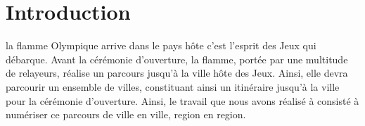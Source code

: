 \section{Introduction}\label{introduction}

\quad\quad la flamme Olympique arrive dans le pays hôte c’est l’esprit des
Jeux qui débarque. Avant la cérémonie d'ouverture, la flamme, portée
par une multitude de relayeurs, réalise un parcours jusqu’à la ville hôte des Jeux.
Ainsi, elle devra parcourir un ensemble de villes, constituant ainsi un itinéraire 
jusqu’à la ville pour la cérémonie d'ouverture.
\quad Ainsi, le travail que nous avons réalisé à consisté à numériser ce parcours de
ville en ville, region en region.